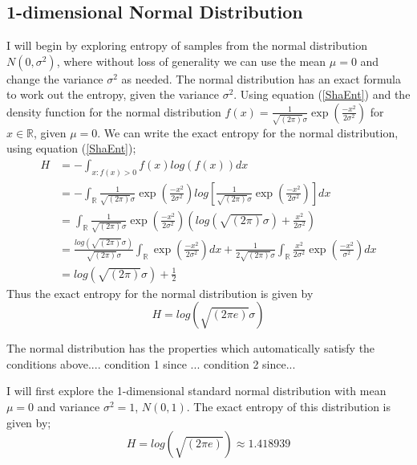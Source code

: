 \documentclass{article}
\begin{document}
\subsection{1-dimensional Normal Distribution} \label{Normal_d=1}
I will begin by exploring entropy of samples from the normal distribution $N(0, \sigma^2)$, where without loss of generality we can use the mean $\mu = 0$ and change the variance $\sigma^2$ as needed. The normal distribution has an exact formula to work out the entropy, given the variance $\sigma^2$. Using equation (\ref{ShaEnt}) and the density function for the normal distribution $f(x) = \frac{1}{\sqrt{(2\pi)} \sigma}\exp{ \left( \frac{-x^2}{2\sigma^2} \right)}$ for $x \in \mathbb{R}$, given $\mu = 0$. We can write the exact entropy for the normal distribution, using equation (\ref{ShaEnt});
\begin{align}
H &= - \int_{x : f(x) > 0} f(x) log(f(x)) dx \nonumber \\
&= - \int_{\mathbb{R}} \frac{1}{\sqrt{(2\pi)} \sigma}\exp{ \left( \frac{-x^2}{2\sigma^2} \right)} log \left[\frac{1}{\sqrt{(2\pi)} \sigma}\exp{ \left( \frac{-x^2}{2\sigma^2} \right)} \right] dx \nonumber \\
&=  \int_{\mathbb{R}} \frac{1}{\sqrt{(2\pi)} \sigma}\exp{ \left( \frac{-x^2}{2\sigma^2} \right)} \left( log(\sqrt{(2\pi)}\sigma) +  \frac{x^2}{2\sigma^2} \right) \nonumber \\
&= \frac{log(\sqrt{(2\pi)}\sigma)}{\sqrt{(2\pi)} \sigma} \int_{\mathbb{R}} \exp{ \left( \frac{-x^2}{2\sigma^2} \right)} dx +  \frac{1}{2\sqrt{(2\pi)} \sigma} \int_{\mathbb{R}} \frac{x^2}{2\sigma^2}  \exp{ \left( \frac{-x^2}{\sigma^2} \right)} dx \nonumber \\
&=  log(\sqrt{(2\pi)}\sigma) + \frac{1}{2} \nonumber 
\end{align}
Thus the exact entropy for the normal distribution is given by 
\begin{equation}\label{NormalEnt}
H =  log(\sqrt{(2\pi e)}\sigma) 
\end{equation}

The normal distribution has the properties which automatically satisfy the conditions above.... condition 1 since ... condition 2 since...

I will first explore the 1-dimensional standard normal distribution with mean $\mu = 0$ and variance $\sigma^2 = 1$, $N(0, 1)$. The exact entropy of this distribution is given by;
\begin{equation} \label{normal_exact}
H = log(\sqrt{(2\pi e)}) \approx 1.418939
\end{equation}
\end{document}
